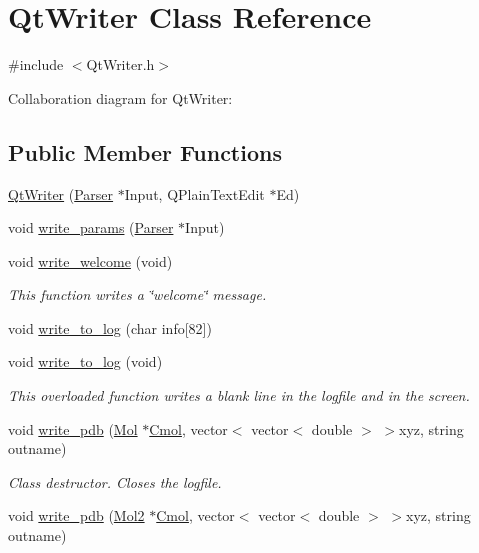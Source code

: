 \hypertarget{classQtWriter}{
\section{QtWriter Class Reference}
\label{classQtWriter}
}


{\ttfamily \#include $<$QtWriter.h$>$}



Collaboration diagram for QtWriter:
\subsection*{Public Member Functions}
\begin{DoxyCompactItemize}
\item 
\hyperlink{classQtWriter_ab6edda21cb7821d1dd6023d89bba120d}{QtWriter} (\hyperlink{classParser}{Parser} $\ast$Input, QPlainTextEdit $\ast$Ed)
\item 
void \hyperlink{classQtWriter_aad5888cbfde83e9bc36e9797414eb69c}{write\_\-params} (\hyperlink{classParser}{Parser} $\ast$Input)
\item 
void \hyperlink{classQtWriter_a22835ce6f128702a1590381c2663e2a2}{write\_\-welcome} (void)
\begin{DoxyCompactList}\small\item\em This function writes a \char`\"{}welcome\char`\"{} message. \end{DoxyCompactList}\item 
void \hyperlink{classQtWriter_a694c77fe8d34955948b14897ddeaaf24}{write\_\-to\_\-log} (char info\mbox{[}82\mbox{]})
\item 
void \hyperlink{classQtWriter_a6188e31823cda6193af9ac3632fb19db}{write\_\-to\_\-log} (void)
\begin{DoxyCompactList}\small\item\em This overloaded function writes a blank line in the logfile and in the screen. \end{DoxyCompactList}\item 
void \hyperlink{classQtWriter_aa4424e7a6279fe116b74d06c05cb500b}{write\_\-pdb} (\hyperlink{classMol}{Mol} $\ast$\hyperlink{classQtWriter_a82288bebcd187b80b54c2093da0ea820}{Cmol}, vector$<$ vector$<$ double $>$ $>$xyz, string outname)
\begin{DoxyCompactList}\small\item\em Class destructor. Closes the logfile. \end{DoxyCompactList}\item 
void \hyperlink{classQtWriter_a2dbb1745b70fefff3a5ae3984b853b4b}{write\_\-pdb} (\hyperlink{classMol2}{Mol2} $\ast$\hyperlink{classQtWriter_a82288bebcd187b80b54c2093da0ea820}{Cmol}, vector$<$ vector$<$ double $>$ $>$xyz, string outname)

\end{DoxyCompactItemize}
